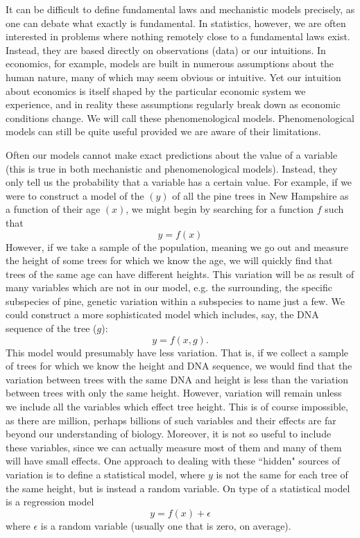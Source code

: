 It can be difficult to define fundamental laws and mechanistic models precisely, as one can debate what exactly is fundamental. In statistics, however, we are often interested in problems where nothing remotely close to a fundamental laws exist. Instead, they are based directly on observations (data) or our intuitions. In economics, for example, models are built in numerous assumptions about the human nature, many of which may seem obvious or intuitive. Yet our intuition about economics is itself shaped by the particular economic system we experience, and in reality these assumptions regularly break down as economic conditions change.  We will call these {\dfn phenomenological models}. Phenomenological models can still be quite useful provided we are aware of their limitations. 


Often our models cannot make exact predictions about the value of a variable (this is true in both mechanistic and phenomenological models). Instead, they only tell us the probability that a variable has a certain value. For example, if we were to construct a model of the $(y)$ of all the pine trees in New Hampshire as a function of their age $(x)$, we might begin by searching for a function $f$ such that
\begin{equation}
y = f(x)
\end{equation}
However, if we take a {\dfn sample} of the population, meaning we go out and measure the height of some trees for which we know the age, we will quickly find that trees of the same age can have different heights.   This variation will be as result of many variables which are not in our model, e.g. the surrounding, the specific subspecies of pine, genetic variation within a subspecies to name just a few. We could construct a more sophisticated model which includes, say, the DNA sequence of the tree ($g$):
\begin{equation}
y = f(x,g).
\end{equation}
This model would presumably have less variation. That is, if we collect a sample of trees for which we know the height and DNA sequence, we would find that the variation between trees with the same DNA and height is less than the variation between trees with only the same height.  However, variation will remain unless we include all the variables which effect tree height. This is of course impossible, as there are million, perhaps billions of such variables and their effects are far beyond our understanding of biology. Moreover, it is not so useful to include these variables, since we can actually measure most of them and many of them will have small effects. One approach to dealing with these ``hidden" sources of variation is to define a {\dfn statistical model}, where $y$ is not the same for each tree of the same height, but is instead a {\dfn random variable}. On type of a statistical model is a regression model
\begin{equation}\label{eq:reg}
y = f(x) + \epsilon
\end{equation}
where $\epsilon$ is a random variable (usually one that is zero, on average). 

